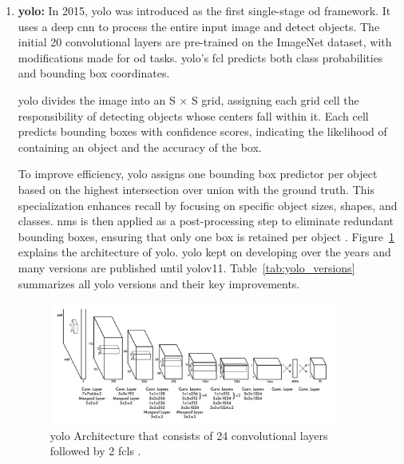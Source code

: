 \begin{enumerate}
    \item \textbf{\gls{yolo}:} In 2015, \gls{yolo} was introduced as the first single-stage \gls{od} framework. It uses a deep \gls{cnn} to process the entire input image and detect objects. The initial 20 convolutional layers are pre-trained on the ImageNet dataset, with modifications made for \gls{od} tasks. \gls{yolo}’s \gls{fcl} predicts both class probabilities and bounding box coordinates.

    \gls{yolo} divides the image into an S × S grid, assigning each grid cell the responsibility of detecting objects whose centers fall within it. Each cell predicts bounding boxes with confidence scores, indicating the likelihood of containing an object and the accuracy of the box.

    To improve efficiency, \gls{yolo} assigns one bounding box predictor per object based on the highest intersection over union with the ground truth. This specialization enhances recall by focusing on specific object sizes, shapes, and classes. \gls{nms} is then applied as a post-processing step to eliminate redundant bounding boxes, ensuring that only one box is retained per object \cite{YOLO}. Figure~\ref{YOLO} explains the architecture of \gls{yolo}. \gls{yolo} kept on developing over the years and many versions are published until \gls{yolo}v11. Table~\ref{tab:yolo_versions} summarizes all \gls{yolo} versions and their key improvements.

    \begin{figure}[!ht]
        \centering
        \includegraphics[width=0.9\textwidth]{Figures/YOLO.PNG} 
        \caption{\gls{yolo} Architecture that consists of 24 convolutional layers followed by 2 \gls{fcl}s \cite{YOLO}.}
        \label{YOLO}
    \end{figure}



\end{enumerate}
